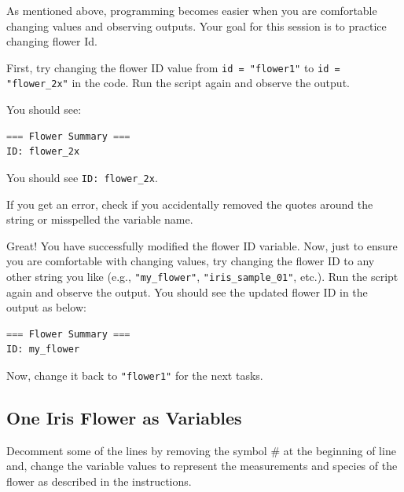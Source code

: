 As mentioned above, programming becomes easier when you are comfortable changing values and observing outputs.
Your goal for this session is to practice changing flower Id.

First, try changing the flower ID value from \texttt{id = "flower1"} to \texttt{id = "flower\_2x"} in the code.
Run the script again and observe the output.

You should see:
\begin{lstlisting}[language=Python]
=== Flower Summary ===
ID: flower_2x
\end{lstlisting}

\begin{tcolorbox}[title=Checkpoint]
You should see \texttt{ID: flower\_2x}.
\end{tcolorbox}
\begin{tcolorbox}[title=Common Mistakes]
If you get an error, check if you accidentally removed the quotes around the string or misspelled the variable name.
\end{tcolorbox}

Great! You have successfully modified the flower ID variable.
Now, just to ensure you are comfortable with changing values, try changing the flower ID to any other string you like (e.g., \texttt{"my\_flower"}, \texttt{"iris\_sample\_01"}, etc.).
Run the script again and observe the output.
You should see the updated flower ID in the output as below:
\begin{lstlisting}[language=Python]
=== Flower Summary ===
ID: my_flower
\end{lstlisting}

Now, change it back to \texttt{"flower1"} for the next tasks.

\subsection{One Iris Flower as Variables}

\noindent
\begin{tcolorbox}[title=Task 3: Define more variables for one Iris flower]
Decomment some of the lines by removing the symbol $\#$ at the beginning of line and, change the variable values to represent the measurements and species of the flower as described in the instructions.
\end{tcolorbox}


